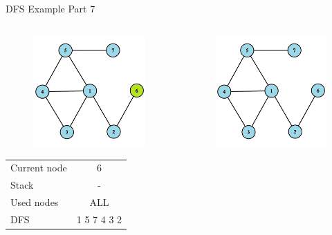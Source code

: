 \documentclass[aspectratio=169]{beamer}%
\begin{document}
\begin{frame}{DFS Example Part 7}
\begin{columns}
\begin{column}{0.32\textwidth}
\begin{figure}[!ht]
                \includegraphics[width=0.9\linewidth]{dfs 20.png}
            \end{figure}
            \begin{table}[ht]
                \centering
                \begin{tabular}{l c}
                    Current node & 6\\
                    Stack & -\\ 
                    Used nodes & ALL\\
                    DFS & 1 5 7 4 3 2 
                \end{tabular}
            \end{table}
        \end{column}
        \hfill
        \begin{column}{0.32\textwidth}
            \begin{figure}[!ht]
                \centering
                \includegraphics[width=0.9\linewidth]{dfs 21.png}

\end{figure}
\end{column}
\end{columns}
\end{frame}
\end{document}
